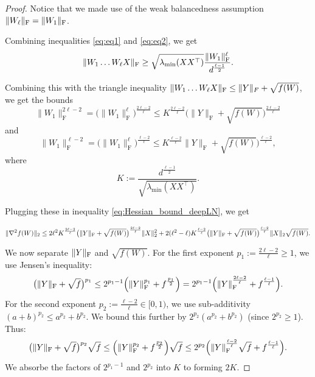 \documentclass[a4paper,11pt]{article}
\DeclarePairedDelimiter{\norm}{\|}{\|}
\newcommand{\1}{\mathbbm{1}}
\theoremstyle{plain}
\begin{document}
\begin{proof}
Notice that we made use of the weak balancedness assumption $\|W_{\ell}\|_{\rm F} = \|W_1\|_{\rm F}$.

Combining inequalities \eqref{eq:eq1} and \eqref{eq:eq2}, we get
\begin{equation}
\label{eq:basic_deep_linear}
    \|W_1 \dots W_{\ell} X\|_{\rm F} \geq \sqrt{\lambda_{\min}(X X^\top)} \frac{\|W_1\|_{\rm F}^{\ell}}{d^{\frac{\ell-1}{2}}}.
\end{equation}

Combining this with the triangle inequality $\|W_1 \dots W_{\ell} X\|_{\rm F} \leq \|Y\|_F +\sqrt{f(W)}$, we get the bounds
\begin{equation*}
\|W_1\|_{\mathrm F}^{2\ell-2} = \Big(\|W_1\|_{\mathrm F}^\ell\Big)^{\frac{2\ell-2}{\ell}}
\le K^{\frac{2\ell-2}{\ell}}\big(\|Y\|_{\mathrm F}+\sqrt{f(W)}\big)^{\frac{2\ell-2}{\ell}}
\end{equation*}
and
\begin{equation*}
\|W_1\|_{\mathrm F}^{\ell-2} = \Big(\|W_1\|_{\mathrm F}^\ell\Big)^{\frac{\ell-2}{\ell}}
\le K^{\frac{\ell-2}{\ell}}\big\|Y\|_{\mathrm F}+\sqrt{f(W)}\big)^{\frac{\ell-2}{\ell}},
\end{equation*}
where
\begin{equation}
\label{eq:Kdef}
K:=\frac{d^{\frac{\ell-1}{2}}}{\sqrt{\lambda_{\min}(XX^\top)}}.
\end{equation}

Plugging these in inequality \eqref{eq:Hessian_bound_deepLN}, we get

\begin{align}
\label{eq:Hessian_bound_global_LN}
\norm{\nabla^2 f(W)}_2
\le 2\ell^2K^{\frac{2\ell-2}{\ell}}\big(\norm{Y}_{\mathrm F}+\sqrt{f(W)}\big)^{\frac{2\ell-2}{\ell}}\norm{X}_2^2
+2(\ell^2-\ell)K^{\frac{\ell-2}{\ell}}\big(\norm{Y}_{\mathrm F}+\sqrt{f(W)}\big)^{\frac{\ell-2}{\ell}}\norm{X}_2\sqrt{f(W)}.
\end{align}
 
We now separate $\norm{Y}_{\mathrm F}$ and $\sqrt{f(W)}$.
For the first exponent $p_1:=\frac{2\ell-2}{\ell}\ge1$, we use Jensen's inequality:
\begin{equation*}
\big(\norm{Y}_{\mathrm F}+\sqrt{f}\big)^{p_1}
\le 2^{p_1-1}\Big(\norm{Y}_{\mathrm F}^{p_1}+f^{\frac{p_1}{2}}\Big)
=2^{p_1-1}\Big(\norm{Y}_{\mathrm F}^{\frac{2\ell-2}{\ell}}+f^{\frac{\ell-1}{\ell}}\Big).
\end{equation*}
For the second exponent $p_2:=\frac{\ell-2}{\ell}\in[0,1)$, we use sub-additivity $(a+b)^{p_2} \le a^{p_2} + b^{p_2}$.
We bound this further by $2^{p_2}(a^{p_2} + b^{p_2})$ (since $2^{p_2}\ge 1$). Thus:
\begin{equation*}
\big(\norm{Y}_{\mathrm F}+\sqrt{f}\big)^{p_2}\sqrt{f}
\le \Big(\norm{Y}_{\mathrm F}^{p_2} + f^{\frac{p_2}{2}}\Big)\sqrt{f}
\le 2^{p_2}\Big(\norm{Y}_{\mathrm F}^{\frac{\ell-2}{\ell}}\sqrt{f} + f^{\frac{\ell-1}{\ell}}\Big).
\end{equation*}
We absorbe the factors of $2^{p_1-1}$ and $2^{p_2}$ into $K$ to forming $2K$.


\end{proof}
\end{document}
